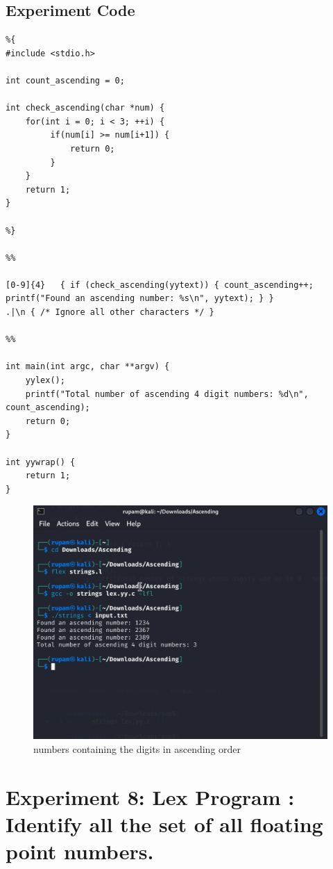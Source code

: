\documentclass[12pt]{article}
\begin{document}
\subsection*{Experiment Code}
\begin{lstlisting}
%{
#include <stdio.h>

int count_ascending = 0;

int check_ascending(char *num) {
    for(int i = 0; i < 3; ++i) {
         if(num[i] >= num[i+1]) {
             return 0;
         }
    }
    return 1;
}

%}

%%

[0-9]{4}   { if (check_ascending(yytext)) { count_ascending++; printf("Found an ascending number: %s\n", yytext); } }
.|\n { /* Ignore all other characters */ }

%%

int main(int argc, char **argv) {
    yylex();
    printf("Total number of ascending 4 digit numbers: %d\n", count_ascending);
    return 0;
}

int yywrap() {
    return 1;
}
\end{lstlisting}
\begin{figure}[H]
    \centering
    \includegraphics[width=1\linewidth]{exp7output.png}
    \caption{numbers containing the digits in ascending order}
\end{figure}

\newpage
\section*{Experiment 8: Lex Program : Identify all the set of all floating point numbers.}
\end{document}
